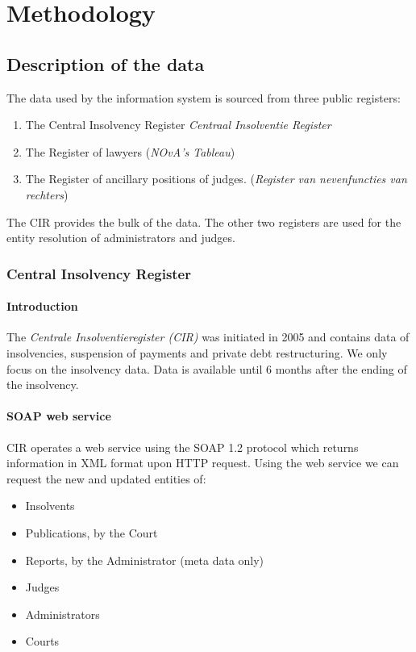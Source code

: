 \section{Methodology}
\subsection{Description of the data}
The data used by the information system is sourced from three public registers:
\begin{enumerate}
	\item The Central Insolvency Register \textit{Centraal Insolventie Register}
	\item The Register of lawyers (\textit{NOvA's Tableau}) 
	\item The Register of ancillary positions of judges. (\textit{Register van nevenfuncties van rechters}) 
\end{enumerate}
	
The CIR provides the bulk of the data. The other two registers are used for the entity resolution of administrators and judges.

\subsubsection{Central Insolvency Register}
\paragraph{Introduction}
The \textit{Centrale Insolventieregister (CIR)} \cite{rechtspraak:1} was initiated in 2005 and contains data of insolvencies, suspension of payments and private debt restructuring. We only focus on the insolvency data. Data is available until 6 months after the ending of the insolvency. 

\paragraph{SOAP web service}
CIR operates a web service using the SOAP 1.2 protocol which returns information in XML format upon HTTP request. Using the web service we can request the new and updated entities of:

\begin{itemize}
	\item Insolvents
	\item Publications, by the Court
	\item Reports, by the Administrator (meta data only)
	\item Judges 
	\item Administrators
	\item Courts
\end{itemize}

